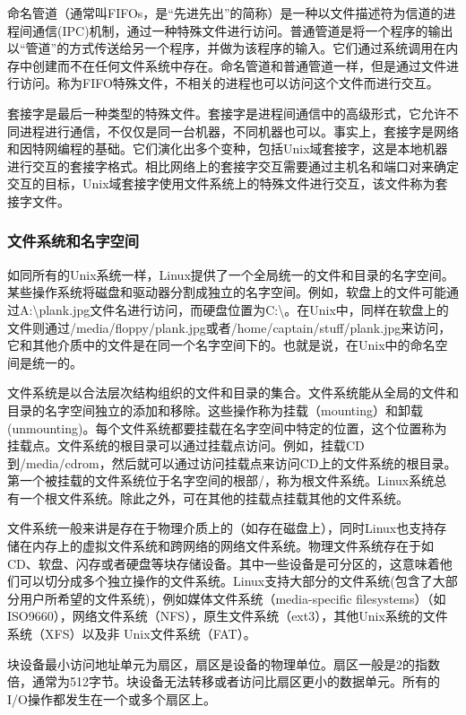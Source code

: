 命名管道（通常叫FIFOs，是“先进先出”的简称）是一种以文件描述符为信道的进程间通信(IPC)机制，通过一种特殊文件进行访问。普通管道是将一个程序的输出以“管道”的方式传送给另一个程序，并做为该程序的输入。它们通过系统调用在内存中创建而不在任何文件系统中存在。命名管道和普通管道一样，但是通过文件进行访问。称为FIFO特殊文件，不相关的进程也可以访问这个文件而进行交互。

套接字是最后一种类型的特殊文件。套接字是进程间通信中的高级形式，它允许不同进程进行通信，不仅仅是同一台机器，不同机器也可以。事实上，套接字是网络和因特网编程的基础。它们演化出多个变种，包括Unix域套接字，这是本地机器进行交互的套接字格式。相比网络上的套接字交互需要通过主机名和端口对来确定交互的目标，Unix域套接字使用文件系统上的特殊文件进行交互，该文件称为套接字文件。

\subsubsection{文件系统和名字空间}

如同所有的Unix系统一样，Linux提供了一个全局统一的文件和目录的名字空间。某些操作系统将磁盘和驱动器分割成独立的名字空间。例如，软盘上的文件可能通过A:\textbackslash plank.jpg文件名进行访问，而硬盘位置为C:\textbackslash。在Unix中，同样在软盘上的文件则通过/media/floppy/plank.jpg或者/home/captain/stuff/plank.jpg来访问，它和其他介质中的文件是在同一个名字空间下的。也就是说，在Unix中的命名空间是统一的。

文件系统是以合法层次结构组织的文件和目录的集合。文件系统能从全局的文件和目录的名字空间独立的添加和移除。这些操作称为挂载（mounting）和卸载(unmounting)。每个文件系统都要挂载在名字空间中特定的位置，这个位置称为挂载点。文件系统的根目录可以通过挂载点访问。例如，挂载CD到/media/cdrom，然后就可以通过访问挂载点来访问CD上的文件系统的根目录。第一个被挂载的文件系统位于名字空间的根部/，称为根文件系统。Linux系统总有一个根文件系统。除此之外，可在其他的挂载点挂载其他的文件系统。

文件系统一般来讲是存在于物理介质上的（如存在磁盘上），同时Linux也支持存储在内存上的虚拟文件系统和跨网络的网络文件系统。物理文件系统存在于如CD、软盘、闪存或者硬盘等块存储设备。其中一些设备是可分区的，这意味着他们可以切分成多个独立操作的文件系统。Linux支持大部分的文件系统(包含了大部分用户所希望的文件系统)，例如媒体文件系统（media-specific filesystems）（如ISO9660），网络文件系统（NFS），原生文件系统（ext3），其他Unix系统的文件系统（XFS）以及非 Unix文件系统（FAT）。

块设备最小访问地址单元为扇区，扇区是设备的物理单位。扇区一般是2的指数倍，通常为512字节。块设备无法转移或者访问比扇区更小的数据单元。所有的I/O操作都发生在一个或多个扇区上。

